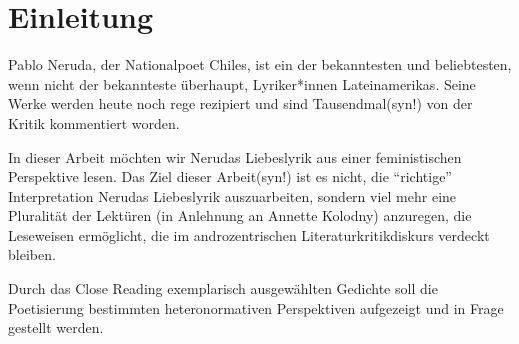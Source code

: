 \section{Einleitung}

Pablo Neruda, der Nationalpoet Chiles, ist ein der bekanntesten und beliebtesten, wenn nicht der bekannteste überhaupt, Lyriker*innen Lateinamerikas.
Seine Werke werden heute noch rege rezipiert und sind Tausendmal(syn!) von der Kritik kommentiert worden.


In dieser Arbeit möchten wir Nerudas Liebeslyrik aus einer feministischen Perspektive lesen.
Das Ziel dieser Arbeit(syn!) ist es nicht, die ``richtige'' Interpretation Nerudas Liebeslyrik auszuarbeiten, sondern viel mehr eine Pluralität der Lektüren (in Anlehnung an Annette Kolodny) anzuregen, die Leseweisen ermöglicht, die im androzentrischen Literaturkritikdiskurs verdeckt bleiben.


Durch das Close Reading exemplarisch ausgewählten Gedichte soll die Poetisierung bestimmten heteronormativen Perspektiven aufgezeigt und in Frage gestellt werden.

\begin{comment}
1. Intro
  * Ziel von Feministischen Lektüren: zugrunde liegende Machtstrukturen in Werken und deren Rezeption aufzudecken
    ** androzentrische Perspektive der Literatur:
       *** Männer in Mittelpunkt (als Figuren)
       *** von Männern gemacht
       *** an Männer gerichtet
  * Wie erreicht? Durch eine Pluralität der Lektüren und Close Reading
ohne das ouevre Nerudas nicht als ganzes in Frage stellen
exemplarische Lektüren: Poetisierung bestimmter Heteronormativen Perspektiven
gehört historisiert; nicht als zeitlos darzustellen
\end{comment}
